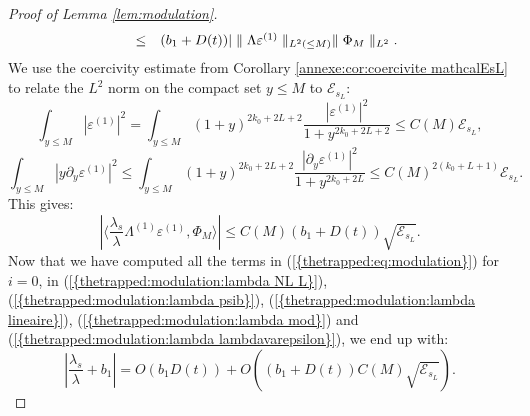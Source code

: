 \documentclass[11pt,a4paper,reqno]{amsart}
\theoremstyle{remark}
\numberwithin{equation}{section}
\begin{document}
\begin{proof}[Proof of Lemma \ref{lem:modulation}]
$$\begin{array}{r c l}
&\leq& (b_1+D(t))|\parallel \Lambda \varepsilon^{(1)} \parallel_{L^2(\leq M)}\parallel \Phi_M\parallel_{L^2} .
\end{array}
$$
We use the coercivity estimate from Corollary \ref{annexe:cor:coercivite mathcalEsL} to relate the $L^2$ norm on the compact set $y\leq M$ to $\mathcal{E}_{s_L}$:
$$
\int_{y\leq M} |\varepsilon^{(1)}|^2 = \int_{y\leq M} (1+y)^{2k_0+2L+2}\frac{|\varepsilon^{(1)}|^2}{1+y^{2k_0+2L+2}} \leq  C(M)\mathcal{E}_{s_L} ,
$$
$$
\int_{y\leq M} |y\partial_y\varepsilon^{(1)}|^2 \leq \int_{y\leq M} (1+y)^{2k_0+2L+2}\frac{|\partial_y \varepsilon^{(1)}|^2}{1+y^{2k_0+2L}} \leq C(M)^{2(k_0+L+1)}\mathcal{E}_{s_L} .
$$
This gives:
\begin{equation} \label{thetrapped:modulation:lambda lambdavarepsilon}
|\langle \frac{\lambda_s}{\lambda}\Lambda^{(1)} \varepsilon^{(1)}, \Phi_M\rangle|\leq C(M)(b_1+D(t))\sqrt{\mathcal{E}_{s_L}}.
\end{equation}
Now that we have computed all the terms in {{\rm (\ref{{thetrapped:eq:modulation}})}} for $i=0$, in {{\rm (\ref{{thetrapped:modulation:lambda NL L}})}}, {{\rm (\ref{{thetrapped:modulation:lambda psib}})}}, {{\rm (\ref{{thetrapped:modulation:lambda lineaire}})}}, {{\rm (\ref{{thetrapped:modulation:lambda mod}})}} and {{\rm (\ref{{thetrapped:modulation:lambda lambdavarepsilon}})}}, we end up with:
\begin{equation}\label{eq:estimation modulation lambda}
\left| \frac{\lambda_s}{\lambda}+b_1 \right|=O(b_1 D(t))+O((b_1+D(t))C(M)\sqrt{\mathcal{E}_{s_L}}) .
\end{equation}


\end{proof}
\end{document}
